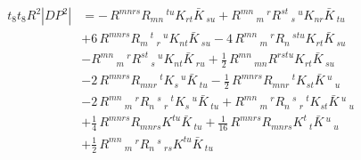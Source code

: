 \begin{equation}
\begin{aligned}
t_8 t_8 R^2 |DP^2|
&=-\,R^{m n r s} R_{m n}\,^{t u} K_{r t} \bar{K}\,_{s u}
+R^{m n}\,_{m}\,^{r} R^{s t}\,_{s}\,^{u} K_{n r} \bar{K}\,_{t u}\\
&+6\,R^{m n r s} R_{m}\,^{t}\,_{r}\,^{u} K_{n t} \bar{K}\,_{s u}
-4\,R^{m n}\,_{m}\,^{r} R_{n}\,^{s t u} K_{r t} \bar{K}\,_{s u}\\
&-R^{m n}\,_{m}\,^{r} R^{s t}\,_{s}\,^{u} K_{n t} \bar{K}\,_{r u}
+\frac{1}{2}\,R^{m n}\,_{m n} R^{r s t u} K_{r t} \bar{K}\,_{s u}\\
&-2\,R^{m n r s} R_{m n r}\,^{t} K_{s}\,^{u} \bar{K}\,_{t u}
-\frac{1}{2}\,R^{m n r s} R_{m n r}\,^{t} K_{s t} \bar{K}\,^{u}\,_{u}\\
&-2\,R^{m n}\,_{m}\,^{r} R_{n}\,^{s}\,_{r}\,^{t} K_{s}\,^{u} \bar{K}\,_{t u}
+R^{m n}\,_{m}\,^{r} R_{n}\,^{s}\,_{r}\,^{t} K_{s t} \bar{K}\,^{u}\,_{u}\\
&+\frac{1}{4}\,R^{m n r s} R_{m n r s} K^{t u} \bar{K}\,_{t u}
+\frac{1}{16}\,R^{m n r s} R_{m n r s} K^{t}\,_{t} \bar{K}\,^{u}\,_{u}\\
&+\frac{1}{2}\,R^{m n}\,_{m}\,^{r} R_{n}\,^{s}\,_{r s} K^{t u} \bar{K}\,_{t u}
\end{aligned}
\end{equation}


